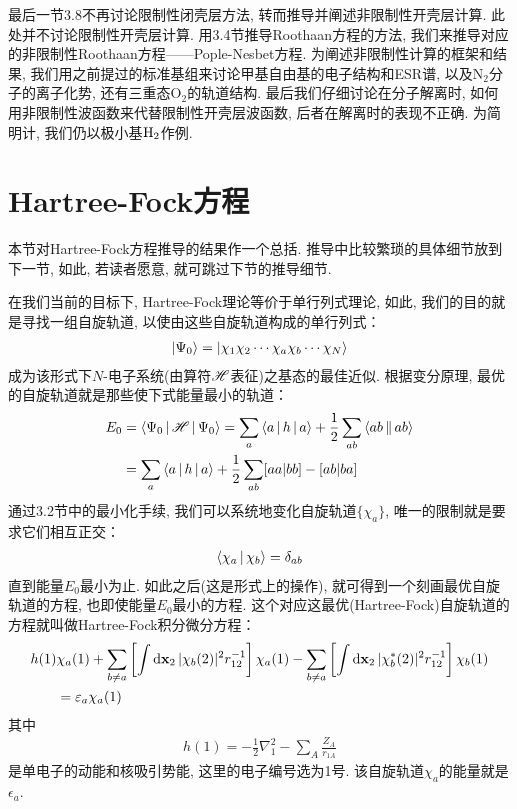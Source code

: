 最后一节3.8不再讨论限制性闭壳层方法, 转而推导并阐述非限制性开壳层计算. 此处并不讨论限制性开壳层计算. 用3.4节推导Roothaan方程的方法, 我们来推导对应的非限制性Roothaan方程——Pople-Nesbet方程. 为阐述非限制性计算的框架和结果, 我们用之前提过的标准基组来讨论甲基自由基的电子结构和ESR谱, 以及$\mathrm{N}_2$分子的离子化势, 还有三重态$\mathrm{O}_2$的轨道结构. 最后我们仔细讨论在分子解离时, 如何用非限制性波函数来代替限制性开壳层波函数, 后者在解离时的表现不正确. 为简明计, 我们仍以极小基$\mathrm{H}_2$作例.

\section{Hartree-Fock方程}
本节对Hartree-Fock方程推导的结果作一个总括. 推导中比较繁琐的具体细节放到下一节, 如此, 若读者愿意, 就可跳过下节的推导细节. 

在我们当前的目标下, Hartree-Fock理论等价于单行列式理论, 如此, 我们的目的就是寻找一组自旋轨道, 以使由这些自旋轨道构成的单行列式：
\begin{align}
\Ket{\Psi_0} = \Ket{\chi_1\chi_2\cdots\chi_a\chi_b\cdots\chi_N}
\end{align}
成为该形式下$N$-电子系统(由算符$\mathscr{H}$表征)之基态的最佳近似. 根据变分原理, 最优的自旋轨道就是那些使下式能量最小的轨道：
\begin{align}
E_0 & = \Braket{\Psi_0|\mathscr{H}|\Psi_0} = \sum_a\Braket{a|h|a} + \frac{1}{2}\sum_{ab}\Braket{ab||ab}\notag \\
    & = \sum_a\Braket{a|h|a} + \frac{1}{2}\sum_{ab}[aa|bb]-[ab|ba]
\end{align}
通过3.2节中的最小化手续, 我们可以系统地变化自旋轨道$\{\chi_a\}$, 唯一的限制就是要求它们相互正交：
\begin{align}
\Braket{\chi_a|\chi_b} = \delta_{ab}
\end{align} 
直到能量$E_0$最小为止. 如此之后(这是形式上的操作), 就可得到一个刻画最优自旋轨道的方程, 也即使能量$E_0$最小的方程. 这个对应这最优(Hartree-Fock)自旋轨道的方程就叫做Hartree-Fock积分微分方程：
\begin{align}
\label{3.4}
h(1)&\chi_a(1) + \sum_{b\neq a}\left[ \int\dd{x}_2\,|\chi_b(2)|^2 r_{12}^{-1} \right]\chi_a(1) - \sum_{b\neq a}\left[ \int\dd{x}_2\,|\chi_b^*(2)|^2 r_{12}^{-1} \right]\chi_b(1)\notag\\
&=\epsilon_a\chi_a(1)
\end{align}
其中
\begin{align}
h(1) = -\frac{1}{2}\nabla_1^2 - \sum_A\frac{Z_A}{r_{1A}}
\end{align}
是单电子的动能和核吸引势能, 这里的电子编号选为1号. 该自旋轨道$\chi_a$的能量就是$\epsilon_a$.

